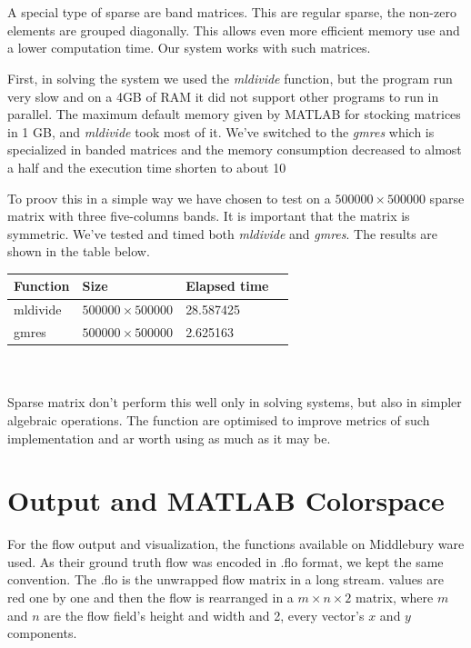 \documentclass[12pt,a4paper,twoside]{report}
\begin{document}
{\begin{tabular}{ l l  l l }
\end{tabular}
\\
\\

A special type of sparse are band matrices. This are regular sparse, the non-zero elements are grouped diagonally. This allows even more efficient memory use and a lower computation time.  Our system works with such matrices. 

First, in solving the system we used the \textit{mldivide} function, but the program run very slow and on a 4GB of RAM it did not support other programs to run in parallel. The maximum default memory given by MATLAB for stocking matrices in 1 GB, and \textit{mldivide} took most of it.
We've switched to the \textit{gmres} which is specialized in banded matrices and the memory consumption decreased to almost a half and the execution time shorten to about 10%

To proov this in a simple way we have chosen to test on a  $500000 \times 500000$ sparse matrix with three five-columns bands. It is important that the matrix is symmetric. We've tested and timed both \textit{mldivide} and \textit{gmres}. The results are shown in the table below.
\\

\begin{tabular}{ l l  l l }
	\hline
	Function  &           Size  &                Elapsed time   \\
	\hline
mldivide    &    $500000\times 500000$      &      28.587425   \\
gmres  &    $500000\times 500000$       &         2.625163   
	
\end{tabular}
\\
\\

Sparse matrix don't perform this well only in solving systems, but also in simpler algebraic operations. The function are optimised to improve metrics of such implementation and ar worth using as much as it may be.

\section{Output and MATLAB Colorspace}


For the flow output and visualization, the functions available on Middlebury ware used.
As their ground truth flow was encoded in .flo format, we kept the same convention. The .flo is the unwrapped flow matrix in a long stream. values are red one by one and then the flow is rearranged in a $m\times n \times 2$ matrix, where $m$ and $n$ are the flow field's height and width and 2, every vector's $x$ and $y$ components.

}
\end{document}
